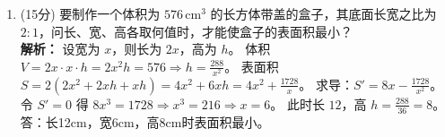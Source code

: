 \documentclass[10pt, a3paper, landscape, twocolumn]{article}
\begin{document}
\begin{enumerate}[start=17]
{\begin{minipage}[t]{0.4\linewidth}
        
        \vspace{0.5cm}
    \end{minipage}
    }
    \vspace{4cm}

    \item (15分) 要制作一个体积为 $576 \, \text{cm}^3$ 的长方体带盖的盒子，其底面长宽之比为 $2:1$，问长、宽、高各取何值时，才能使盒子的表面积最小？ \\
    {\color{red} \small \textbf{解析：} 
    设宽为 $x$，则长为 $2x$，高为 $h$。
    体积 $V = 2x \cdot x \cdot h = 2x^2h = 576 \Rightarrow h = \frac{288}{x^2}$。
    \newline
    表面积 $S = 2(2x^2 + 2xh + xh) = 4x^2 + 6xh = 4x^2 + \frac{1728}
    {x}$。
    \newline
    求导：$S' = 8x - \frac{1728}{x^2}$。令 $S'=0$ 得 $8x^3 = 1728 \Rightarrow x^3 = 216 \Rightarrow x = 6$。
    \newline
    此时长 $12$，高 $h = \frac{288}{36} = 8$。
    答：长12cm，宽6cm，高8cm时表面积最小。
    }
    \vspace{4cm}
\end{enumerate}
\end{document}
